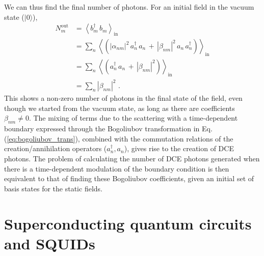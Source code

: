 We can thus find the final number of photons. For an initial field in the vacuum state ($\lvert0\rangle$), 
%
\begin{equation}\label{eq:bogoliubov_dce}
\begin{aligned}
    N^{\text{out}}_m &= \left\langle b_m^{\dagger} \, b_m \right\rangle_{\text{in}}\\
    &= \sum_n
    \left\langle
    \left(
    |\alpha_{nm}|^2 \, a_n^{\dagger} \, a_n \, + \, 
    |\beta_{nm}|^2 \, a_n \, a_n^{\dagger}
    \right)
    \right\rangle_{\text{in}}\\
    &= \sum_n
    \left\langle
    \left(
    a_n^{\dagger} \, a_n \, + \, |\beta_{nm}|^2 
    \right)
    \right\rangle_{\text{in}}\\
    &= \sum_n |\beta_{nm}|^2 \, \, .
\end{aligned}
\end{equation}
%
This shows a non-zero number of photons in the final state of the field, even though we started from the vacuum state, as long as there are coefficients $\beta_{nm} \neq 0$. The mixing of terms due to the scattering with a time-dependent boundary expressed through the Bogoliubov transformation 
in Eq.\,(\ref{eq:bogoliubov_trans}), combined with the commutation relations of the creation/annihilation operators ($a_n^{\dagger}, a_n $), 
gives rise to the creation of DCE photons. The problem of calculating the number of DCE photons generated when there is a time-dependent modulation of the boundary condition is then equivalent to that of finding these Bogoliubov coefficients, given an initial set of basis states for the static fields. 


\section{Superconducting quantum circuits and SQUIDs}\label{sec:SC_and_SQUIDs}

